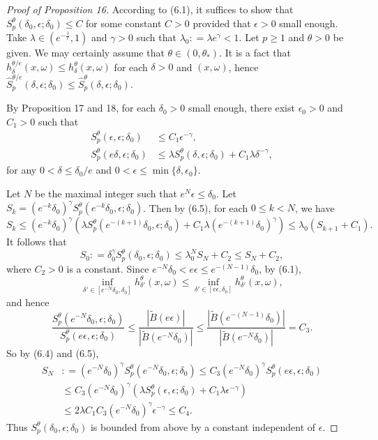 \documentclass[11pt,oneside]{article}
\theoremstyle{plain}
\numberwithin{equation}{section}
\numberwithin{figure}{section}
\numberwithin{table}{section}
\begin{document}
\begin{proof}[Proof of Proposition 16]

According to (6.1), it suffices to show that $S_p^{\theta} (\delta_0, \epsilon; \delta_0) \leq C$ for some constant $C>0$ provided that $\epsilon > 0$ small enough. Take $\lambda \in (e^{-\frac{1}{\ell}}, 1)$ and $\gamma > 0$ such that $\lambda_0 : = \lambda e^{\gamma} < 1$. Let $p \geq 1$ and $\theta>0$ be given. We may certainly assume that $\theta \in (0, \theta_*)$. It is a fact that $h_{\delta}^{\theta/e}(x, \omega) \leq h_{\delta}^{\theta}(x, \omega)$ for each $\delta > 0$ and $(x, \omega)$, hence $\hat S_p^{\theta/e} (\delta, \epsilon; \delta_0) \leq \hat S_p^{\theta} (\delta, \epsilon; \delta_0)$.


By Proposition 17 and 18, for each $\delta_0 > 0$ small enough, there exist $\epsilon_0 > 0$ and $C_1 > 0$ such that 
\begin{align}
S_p^{\theta} (\epsilon, \epsilon; \delta_0) & \leq C_1 \epsilon^{-\gamma},\\
S_p^{\theta} (e\delta, \epsilon; \delta_0) & \leq \lambda S_p^{\theta} (\delta, \epsilon; \delta_0) + C_1 \lambda \delta^{-\gamma},
\end{align}
for any $0 < \delta \leq \delta_0/e$ and $0 < \epsilon \leq \min \{\delta, \epsilon_0 \}$.


Let $N$ be the maximal integer such that $e^N \epsilon \leq \delta_0$. Let $S_k = (e^{-k} \delta_0)^{\gamma} S_p^{\theta} (e^{-k} \delta_0, \epsilon; \delta_0)$. Then by (6.5), for each $0 \leq k <N$, we have
\[
S_k \leq (e^{-k} \delta_0)^{\gamma} \left( \lambda S_p^{\theta} (e^{-(k+1)} \delta_0, \epsilon; \delta_0) + C_1 \lambda (e^{-(k+1)}\delta_0)^{\gamma}  \right) \leq \lambda_0 (S_{k+1} + C_1).
\]
It follows that 
\[
S_0 : = \delta_0^{\gamma} S_p^{\theta} (\delta_0, \epsilon; \delta_0)  \leq \lambda_0^N S_N + C_2 \leq S_N + C_2,
\]
where $C_2 > 0$ is a constant. Since $e^{-N} \delta_0 < e \epsilon \leq e^{-(N-1)} \delta_0 $, by (6.1), 
\[
\inf_{\delta' \in [e^{-N} \delta_0, \delta_0]} h_{\delta'}^{\theta}(x, \omega) \leq  \inf_{\delta' \in [e \epsilon, \delta_0]} h_{\delta'}^{\theta}(x, \omega),
\]
and hence
\[
\frac{S_p^{\theta} (e^{-N}\delta_0, \epsilon; \delta_0)}{S_p^{\theta} (e\epsilon, \epsilon; \delta_0)} \leq \frac{|\tilde B(e \epsilon)|}{|\tilde B(e^{-N} \delta_0)|} \leq \frac{|\tilde B(e^{-(N-1)} \delta_0)|}{|\tilde B(e^{-N} \delta_0)|} = C_3.
\]
So by (6.4) and (6.5),
\begin{align*}
S_N & : = (e^{-N} \delta_0)^{\gamma} S_p^{\theta} (e^{-N} \delta_0, \epsilon; \delta_0) \leq C_3 (e^{-N} \delta_0)^{\gamma}S_p^{\theta} (e\epsilon, \epsilon; \delta_0) \\
& \leq C_3 (e^{-N} \delta_0)^{\gamma} \left( \lambda S_p^{\theta} (\epsilon, \epsilon; \delta_0) + C_1 \lambda \epsilon^{- \gamma} \right)  \\
& \leq 2 \lambda C_1  C_3 (e^{-N} \delta_0)^{\gamma} \epsilon^{- \gamma}  \leq C_4.
\end{align*}
Thus  $S_p^{\theta} (\delta_0, \epsilon; \delta_0)$ is bounded from above by a constant independent of $\epsilon$.


\end{proof}
\end{document}
